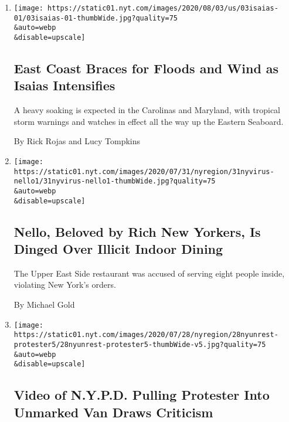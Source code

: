 \begin{enumerate}
\def\labelenumi{\arabic{enumi}.}
\item
  \href{/2020/08/03/us/isaias-east-coast-landfall.html}{}

  \texttt{[image: https://static01.nyt.com/images/2020/08/03/us/03isaias-01/03isaias-01-thumbWide.jpg?quality=75\\\&auto=webp\\\&disable=upscale]}

  \hypertarget{east-coast-braces-for-floods-and-wind-as-isaias-intensifies}{%
  \subsection{East Coast Braces for Floods and Wind as Isaias
  Intensifies}\label{east-coast-braces-for-floods-and-wind-as-isaias-intensifies}}

  A heavy soaking is expected in the Carolinas and Maryland, with
  tropical storm warnings and watches in effect all the way up the
  Eastern Seaboard.

  By Rick Rojas and Lucy Tompkins
\item
  \href{/2020/07/31/nyregion/nello-liquor-license-suspended.html}{}

  \texttt{[image: https://static01.nyt.com/images/2020/07/31/nyregion/31nyvirus-nello1/31nyvirus-nello1-thumbWide.jpg?quality=75\\\&auto=webp\\\&disable=upscale]}

  \hypertarget{nello-beloved-by-rich-new-yorkers-is-dinged-over-illicit-indoor-dining}{%
  \subsection{Nello, Beloved by Rich New Yorkers, Is Dinged Over Illicit
  Indoor
  Dining}\label{nello-beloved-by-rich-new-yorkers-is-dinged-over-illicit-indoor-dining}}

  The Upper East Side restaurant was accused of serving eight people
  inside, violating New York's orders.

  By Michael Gold
\item
  \href{/2020/07/28/nyregion/nypd-protester-van.html}{}

  \texttt{[image: https://static01.nyt.com/images/2020/07/28/nyregion/28nyunrest-protester5/28nyunrest-protester5-thumbWide-v5.jpg?quality=75\\\&auto=webp\\\&disable=upscale]}

  \hypertarget{video-of-nypd-pulling-protester-into-unmarked-van-draws-criticism}{%
  \subsection{Video of N.Y.P.D. Pulling Protester Into Unmarked Van
  Draws
  Criticism}\label{video-of-nypd-pulling-protester-into-unmarked-van-draws-criticism}}


\end{enumerate}
